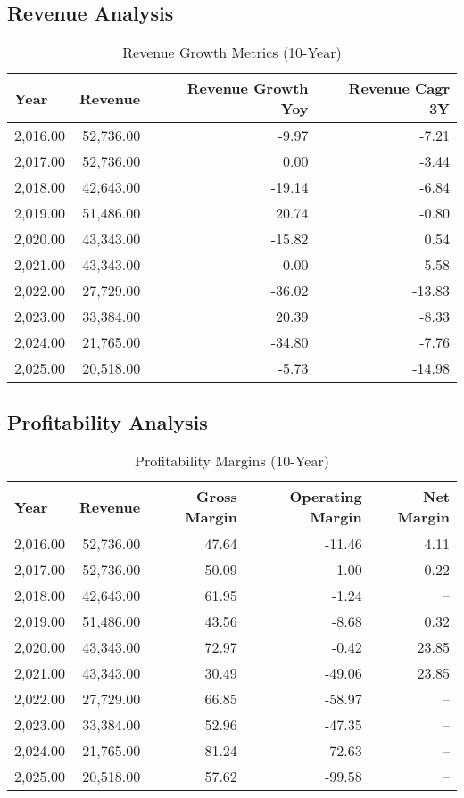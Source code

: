 \documentclass[11pt,a4paper]{article}
\begin{document}
\subsection{Revenue Analysis}

\begin{table}[htbp]
\centering
\caption{Revenue Growth Metrics (10-Year)}
\label{tab:revenue_growth}
\begin{tabular}{lrrr}
\toprule
Year & Revenue & Revenue Growth Yoy & Revenue Cagr 3Y \\
\midrule
2,016.00 & 52,736.00 & -9.97 & -7.21 \\
2,017.00 & 52,736.00 & 0.00 & -3.44 \\
2,018.00 & 42,643.00 & -19.14 & -6.84 \\
2,019.00 & 51,486.00 & 20.74 & -0.80 \\
2,020.00 & 43,343.00 & -15.82 & 0.54 \\
2,021.00 & 43,343.00 & 0.00 & -5.58 \\
2,022.00 & 27,729.00 & -36.02 & -13.83 \\
2,023.00 & 33,384.00 & 20.39 & -8.33 \\
2,024.00 & 21,765.00 & -34.80 & -7.76 \\
2,025.00 & 20,518.00 & -5.73 & -14.98 \\
\bottomrule
\end{tabular}
\end{table}

\subsection{Profitability Analysis}

\begin{table}[htbp]
\centering
\caption{Profitability Margins (10-Year)}
\label{tab:profitability}
\begin{tabular}{lrrrr}
\toprule
Year & Revenue & Gross Margin & Operating Margin & Net Margin \\
\midrule
2,016.00 & 52,736.00 & 47.64 & -11.46 & 4.11 \\
2,017.00 & 52,736.00 & 50.09 & -1.00 & 0.22 \\
2,018.00 & 42,643.00 & 61.95 & -1.24 & -- \\
2,019.00 & 51,486.00 & 43.56 & -8.68 & 0.32 \\
2,020.00 & 43,343.00 & 72.97 & -0.42 & 23.85 \\
2,021.00 & 43,343.00 & 30.49 & -49.06 & 23.85 \\
2,022.00 & 27,729.00 & 66.85 & -58.97 & -- \\
2,023.00 & 33,384.00 & 52.96 & -47.35 & -- \\
2,024.00 & 21,765.00 & 81.24 & -72.63 & -- \\
2,025.00 & 20,518.00 & 57.62 & -99.58 & -- \\
\bottomrule
\end{tabular}
\end{table}
\end{document}
